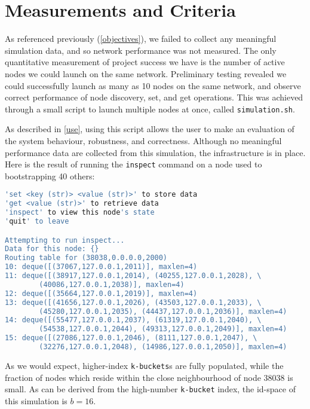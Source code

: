 \documentclass[12pt]{report}
\newcommand{\code}[1]{\colorbox{codegray}{\texttt{#1}}}
\begin{document}
    \section{Measurements and Criteria}
    As referenced previously (\ref{objectives}), we failed to collect any
    meaningful simulation data, and so network performance was not measured.
    The only quantitative measurement of project success we have is the number
    of active nodes we could launch on the same network.  Preliminary testing
    revealed we could successfully launch as many as 10 nodes on the same
    network, and observe correct performance of node discovery, set, and get
    operations.  This was achieved through a small script to launch multiple
    nodes at once, called \code{simulation.sh}.

    As described in \ref{use}, using this script allows the user to make an
    evaluation of the system behaviour, robustness, and correctness.  Although
    no meaningful performance data are collected from this simulation, the
    infrastructure is in place.  Here is the result of running the
    \code{inspect} command on a node used to bootstrapping 40 others:

\begin{lstlisting}[language=bash]
'set <key (str)> <value (str)>' to store data
'get <value (str)>' to retrieve data
'inspect' to view this node's state
'quit' to leave

Attempting to run inspect...
Data for this node: {}
Routing table for (38038,0.0.0.0,2000)
10: deque([(37067,127.0.0.1,2011)], maxlen=4)
11: deque([(38917,127.0.0.1,2014), (40255,127.0.0.1,2028), \
        (40086,127.0.0.1,2038)], maxlen=4)
12: deque([(35664,127.0.0.1,2019)], maxlen=4)
13: deque([(41656,127.0.0.1,2026), (43503,127.0.0.1,2033), \
        (45280,127.0.0.1,2035), (44437,127.0.0.1,2036)], maxlen=4)
14: deque([(55477,127.0.0.1,2037), (61319,127.0.0.1,2040), \
        (54538,127.0.0.1,2044), (49313,127.0.0.1,2049)], maxlen=4)
15: deque([(27086,127.0.0.1,2046), (8111,127.0.0.1,2047), \
        (32276,127.0.0.1,2048), (14986,127.0.0.1,2050)], maxlen=4)
\end{lstlisting}

    As we would expect, higher-index \code{k-buckets}s are fully populated,
    while the fraction of nodes which reside within the close neighbourhood of
    node 38038 is small.  As can be derived from the high-number
    \code{k-bucket} index, the id-space of this simulation is $b=16$.
\end{document}
